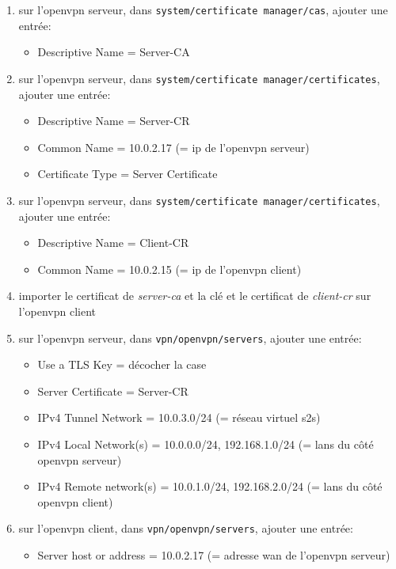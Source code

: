 \documentclass[a4paper]{article}
\begin{document}
\begin{enumerate}
    \item sur l'openvpn serveur, dans \texttt{system/certificate manager/cas}, ajouter une entrée:
    \begin{itemize}
        \item Descriptive Name = Server-CA
    \end{itemize}
    \item sur l'openvpn serveur, dans \texttt{system/certificate manager/certificates}, ajouter une entrée:
    \begin{itemize}
        \item Descriptive Name = Server-CR
        \item Common Name = 10.0.2.17 (= ip de l'openvpn serveur)
        \item Certificate Type = Server Certificate
    \end{itemize}
    \item sur l'openvpn serveur, dans \texttt{system/certificate manager/certificates}, ajouter une entrée:
    \begin{itemize}
        \item Descriptive Name = Client-CR
        \item Common Name = 10.0.2.15 (= ip de l'openvpn client)
    \end{itemize}
    \item importer le certificat de \textit{server-ca} et la clé et le certificat de \textit{client-cr} sur l'openvpn client
    \item sur l'openvpn serveur, dans \texttt{vpn/openvpn/servers}, ajouter une entrée:
    \begin{itemize}
        \item Use a TLS Key = décocher la case
        \item Server Certificate = Server-CR
        \item IPv4 Tunnel Network = 10.0.3.0/24 (= réseau virtuel s2s)
        \item IPv4 Local Network(s) = 10.0.0.0/24, 192.168.1.0/24 (= lans du côté openvpn serveur)
        \item IPv4 Remote network(s) = 10.0.1.0/24, 192.168.2.0/24 (= lans du côté openvpn client)
    \end{itemize}
    \item sur l'openvpn client, dans \texttt{vpn/openvpn/servers}, ajouter une entrée:
    \begin{itemize}
        \item Server host or address = 10.0.2.17 (= adresse wan de l'openvpn serveur)

\end{itemize}
\end{enumerate}
\end{document}
